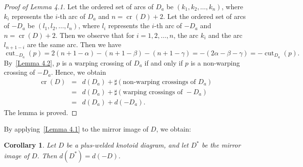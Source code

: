\documentclass[11pt]{amsart}
\theoremstyle{noparens}
\newtheorem{corollary}{Corollary}[section]
\numberwithin{equation}{section}
\numberwithin{equation}{section}
\begin{document}
\begin{proof}[Proof of Lemma 4.1]
 Let the ordered set of arcs of $D_a$ be $(k_1, k_2, \ldots, k_n)$, where $k_i$ represents the $i$-th arc of $D_a$ and $n=\operatorname{cr}(D)+2$. Let the ordered set of arcs of $-D_a$ be $(l_1, l_2, \ldots, l_n)$, where $l_i$ represents the $i$-th arc of $-D_a$ and $n=\operatorname{cr}(D)+2$. Then we observe that for $i = 1, 2, \ldots, n$, the arc $k_i$ and the arc $l_{n+1-i}$ are the same arc. Then we have
$$
\operatorname{cut}_{-D_a}(p) = 2(n + 1 - \alpha) - (n + 1 - \beta) - (n + 1 - \gamma) =-(2\alpha - \beta - \gamma) =-\operatorname{cut}_{D_a}(p).
$$
By~\cref{Lemma 4.2}, $p$ is a warping crossing of $D_a$ if and only if $p$ is a non-warping crossing of $-D_a$.
Hence, we obtain
\begin{eqnarray*}
\operatorname{cr}(D) &= & d (D_a)+\sharp(\text{non-warping crossings of } D_a) \\
& = & d(D_a)+\sharp(\text{warping crossings of } -D_a) \\ 
& = & d(D_a)+d(-D_a).
\end{eqnarray*}
The lemma is proved. 
\end{proof}

By applying~\cref{Lemma 4.1} to the mirror image of $D$, we obtain:

\begin{corollary} \label{Corollary 4.2}
Let $D$ be a plus-welded  knotoid diagram, and let $D^*$ be the mirror image of $D$. Then $d(D^*) = d(-D)$.
\end{corollary}
\end{document}
